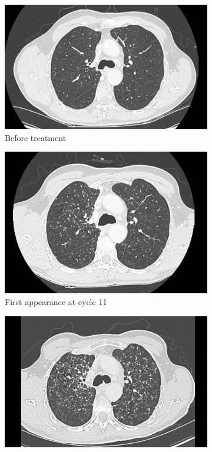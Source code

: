 \documentclass{article}
\begin{document}
\begin{figure}[ht]
  \centering
  \begin{subfigure}[t]{0.45\linewidth}
    \includegraphics[width=\linewidth]{scan-before.png}
    \caption{Before treatment}
    \label{fig:scan1}
  \end{subfigure}
  \begin{subfigure}[t]{0.45\linewidth}
    \includegraphics[width=\linewidth]{scan-m0.png}
    \caption{First appearance at cycle 11}
    \label{fig:scan2}
  \end{subfigure}
  \begin{subfigure}[t]{0.45\linewidth}
    \includegraphics[width=\linewidth]{scan-m3.png}

\end{subfigure}
\end{figure}
\end{document}

